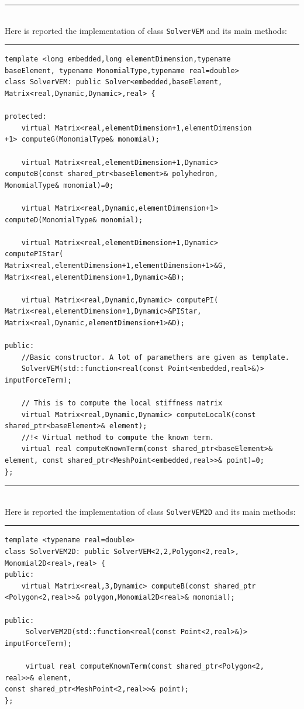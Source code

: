 \noindent\rule{12.7cm}{1pt}\\

Here is reported the implementation of class \verb|SolverVEM| and its main methods:

\noindent\rule{12.7cm}{1pt}
\begin{lstlisting}[caption=File \texttt{SolverVEM.h}]
template <long embedded,long elementDimension,typename 
baseElement, typename MonomialType,typename real=double>
class SolverVEM: public Solver<embedded,baseElement,
Matrix<real,Dynamic,Dynamic>,real> {

protected:
    virtual Matrix<real,elementDimension+1,elementDimension
+1> computeG(MonomialType& monomial);

    virtual Matrix<real,elementDimension+1,Dynamic> 
computeB(const shared_ptr<baseElement>& polyhedron,
MonomialType& monomial)=0;

    virtual Matrix<real,Dynamic,elementDimension+1> 
computeD(MonomialType& monomial);
	
    virtual Matrix<real,elementDimension+1,Dynamic> 
computePIStar(
Matrix<real,elementDimension+1,elementDimension+1>&G,
Matrix<real,elementDimension+1,Dynamic>&B);

    virtual Matrix<real,Dynamic,Dynamic> computePI(
Matrix<real,elementDimension+1,Dynamic>&PIStar,
Matrix<real,Dynamic,elementDimension+1>&D);
	
public:
    //Basic constructor. A lot of paramethers are given as template.
    SolverVEM(std::function<real(const Point<embedded,real>&)>
inputForceTerm);
	
    // This is to compute the local stiffness matrix
    virtual Matrix<real,Dynamic,Dynamic> computeLocalK(const
shared_ptr<baseElement>& element); 
    //!< Virtual method to compute the known term.
    virtual real computeKnownTerm(const shared_ptr<baseElement>& 
element, const shared_ptr<MeshPoint<embedded,real>>& point)=0; 
};
\end{lstlisting}

\noindent\rule{12.7cm}{1pt}\\

Here is reported the implementation of class \verb|SolverVEM2D| and its main methods:

\noindent\rule{12.7cm}{1pt}
\begin{lstlisting}[caption=File \texttt{SolverVEM2D.h}]
template <typename real=double>
class SolverVEM2D: public SolverVEM<2,2,Polygon<2,real>,
Monomial2D<real>,real> {
public:
    virtual Matrix<real,3,Dynamic> computeB(const shared_ptr
<Polygon<2,real>>& polygon,Monomial2D<real>& monomial);

public:
     SolverVEM2D(std::function<real(const Point<2,real>&)> 
inputForceTerm);
    
     virtual real computeKnownTerm(const shared_ptr<Polygon<2,
real>>& element,
const shared_ptr<MeshPoint<2,real>>& point);
};
\end{lstlisting}


